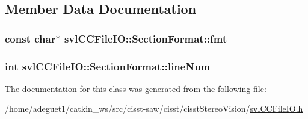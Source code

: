\subsection{Member Data Documentation}
\hypertarget{classsvl_c_c_file_i_o_1_1_section_format_a9b2eefac76715cdabfb228c19fdc814d}{
\subsubsection[{fmt}]{\setlength{\rightskip}{0pt plus 5cm}const char$\ast$ svl\-C\-C\-File\-I\-O\-::\-Section\-Format\-::fmt}}\label{classsvl_c_c_file_i_o_1_1_section_format_a9b2eefac76715cdabfb228c19fdc814d}
\hypertarget{classsvl_c_c_file_i_o_1_1_section_format_a8eb87a3ef3a4d4748edae1fb7af6df36}{
\subsubsection[{line\-Num}]{\setlength{\rightskip}{0pt plus 5cm}int svl\-C\-C\-File\-I\-O\-::\-Section\-Format\-::line\-Num}}\label{classsvl_c_c_file_i_o_1_1_section_format_a8eb87a3ef3a4d4748edae1fb7af6df36}


The documentation for this class was generated from the following file\-:\begin{DoxyCompactItemize}
\item 
/home/adeguet1/catkin\-\_\-ws/src/cisst-\/saw/cisst/cisst\-Stereo\-Vision/\hyperlink{svl_c_c_file_i_o_8h}{svl\-C\-C\-File\-I\-O.\-h}\end{DoxyCompactItemize}
